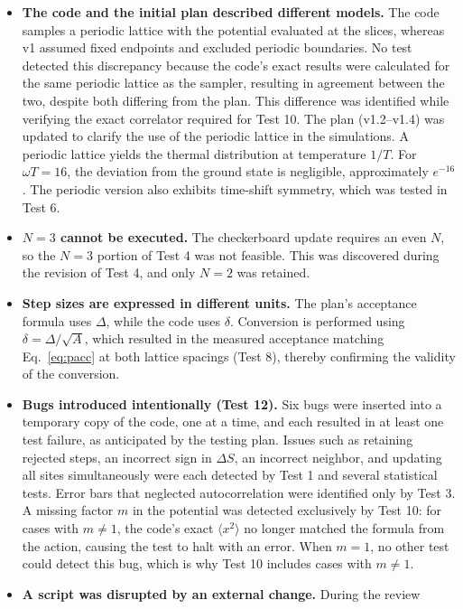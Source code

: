 \documentclass[11pt]{article}
\begin{document}
{\sloppy
\begin{itemize}
\item \textbf{The code and the initial plan described different models.} The
  code samples a periodic lattice with the potential evaluated at the slices,
  whereas v1 assumed fixed endpoints and excluded periodic boundaries. No test
  detected this discrepancy because the code's exact results were calculated
  for the same periodic lattice as the sampler, resulting in agreement between
  the two, despite both differing from the plan. This difference was identified
  while verifying the exact correlator required for Test 10. The plan
  (v1.2--v1.4) was updated to clarify the use of the periodic lattice in the
  simulations. A periodic lattice yields the thermal distribution at
  temperature $1/T$. For $\omega T = 16$, the deviation from the ground state is
  negligible, approximately $e^{-16}$. The periodic version also exhibits
  time-shift symmetry, which was tested in Test 6.
\item \textbf{$N = 3$ cannot be executed.} The checkerboard update requires an
  even $N$, so the $N = 3$ portion of Test 4 was not feasible. This was
  discovered during the revision of Test 4, and only $N = 2$ was retained.
\item \textbf{Step sizes are expressed in different units.} The plan's
  acceptance formula uses $\Delta$, while the code uses $\delta$. Conversion is
  performed using $\delta = \Delta/\sqrt{A}$, which resulted in the measured
  acceptance matching Eq.~\eqref{eq:pacc} at both lattice spacings (Test 8),
  thereby confirming the validity of the conversion.
\item \textbf{Bugs introduced intentionally (Test 12).} Six bugs were inserted
  into a temporary copy of the code, one at a time, and each resulted in at
  least one test failure, as anticipated by the testing plan. Issues such as
  retaining rejected steps, an incorrect sign in $\Delta S$, an incorrect
  neighbor, and updating all sites simultaneously were each detected by Test 1
  and several statistical tests. Error bars that neglected autocorrelation were
  identified only by Test 3. A missing factor $m$ in the potential was detected
  exclusively by Test 10: for cases with $m \ne 1$, the code's exact
  $\langle x^2\rangle$ no longer matched the formula from the action, causing
  the test to halt with an error. When $m = 1$, no other test could detect this
  bug, which is why Test 10 includes cases with $m \ne 1$.
\item \textbf{A script was disrupted by an external change.} During the review

\end{itemize}}
\end{document}
